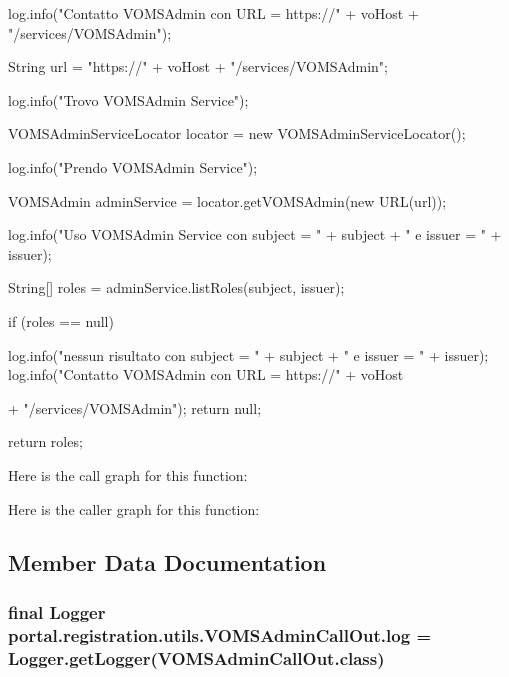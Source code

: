 \begin{DoxyCode}
                                                       {

                log.info("Contatto VOMSAdmin con URL = https://" + voHost
                                + "/services/VOMSAdmin");

                String url = "https://" + voHost + "/services/VOMSAdmin";

                log.info("Trovo VOMSAdmin Service");

                VOMSAdminServiceLocator locator = new VOMSAdminServiceLocator();

                log.info("Prendo VOMSAdmin Service");

                VOMSAdmin adminService = locator.getVOMSAdmin(new URL(url));

                log.info("Uso VOMSAdmin Service con subject = " + subject
                                + " e issuer = " + issuer);

                String[] roles = adminService.listRoles(subject, issuer);

                if (roles == null) {
                        log.info("nessun risultato con subject = " + subject
                                        + " e issuer = " + issuer);
                        log.info("Contatto VOMSAdmin con URL = https://" + voHost
      
                                        + "/services/VOMSAdmin");
                        return null;
                }

                return roles;

        }
\end{DoxyCode}


Here is the call graph for this function:




Here is the caller graph for this function:




\subsection{Member Data Documentation}
\hypertarget{classportal_1_1registration_1_1utils_1_1VOMSAdminCallOut_ab880f67d51ab1f64a091d8dff902a0be}{
\subsubsection[{log}]{\setlength{\rightskip}{0pt plus 5cm}final Logger {\bf portal.registration.utils.VOMSAdminCallOut.log} = Logger.getLogger(VOMSAdminCallOut.class)}}
\label{classportal_1_1registration_1_1utils_1_1VOMSAdminCallOut_ab880f67d51ab1f64a091d8dff902a0be}


